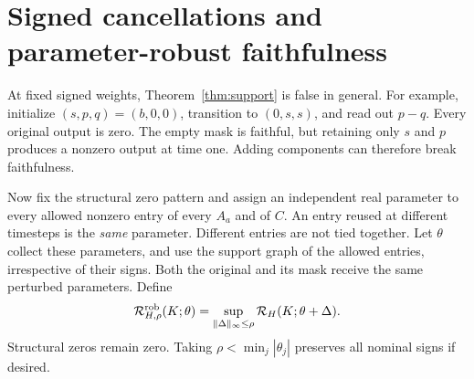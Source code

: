 \section{Signed cancellations and parameter-robust faithfulness}
At fixed signed weights, Theorem~\ref{thm:support} is false in general. For example, initialize $(s,p,q)=(b,0,0)$, transition to $(0,s,s)$, and read out $p-q$. Every original output is zero. The empty mask is faithful, but retaining only $s$ and $p$ produces a nonzero output at time one. Adding components can therefore break faithfulness.

Now fix the structural zero pattern and assign an independent real parameter to every allowed nonzero entry of every $A_a$ and of $C$. An entry reused at different timesteps is the \emph{same} parameter. Different entries are not tied together. Let $\theta$ collect these parameters, and use the support graph of the allowed entries, irrespective of their signs. Both the original and its mask receive the same perturbed parameters. Define
\begin{equation}
 \mathcal R_{H,\rho}^{\mathrm{rob}}(K;\theta)
 =\sup_{\|\Delta\|_\infty\le\rho}\mathcal R_H(K;\theta+\Delta).
 \label{eq:robust}
\end{equation}
Structural zeros remain zero. Taking $\rho<\min_j|\theta_j|$ preserves all nominal signs if desired.

